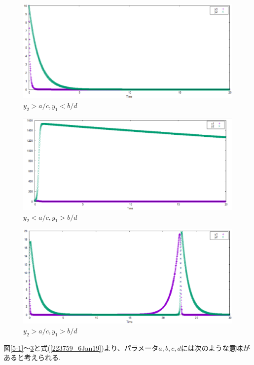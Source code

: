 \begin{figure}[htbp]
\centering
\includegraphics[scale=0.5]{./img/kadai5_2.eps}
\caption{$y_2>a/c,y_1<b/d$}
\label{5-2}
\end{figure}

\begin{figure}[htbp]
\centering
\includegraphics[scale=0.5]{./img/kadai5_3.eps}
\caption{$y_2<a/c,y_1>b/d$}
\label{5-3}
\end{figure}

\begin{figure}[htbp]
\centering
\includegraphics[scale=0.5]{./img/kadai5_4.eps}
\caption{$y_2>a/c,y_1>b/d$}
\label{5-4}
\end{figure}

図\ref{5-1}～\ref{5-4}と式(\ref{223759_6Jan19})より、パラメータ$a,b,c,d$には次のような意味があると考えられる.

